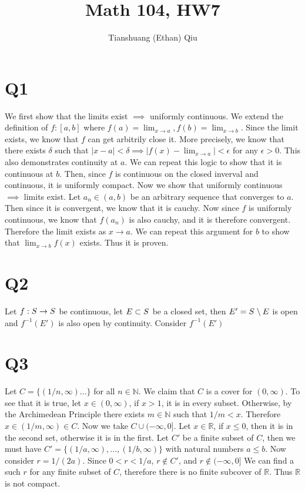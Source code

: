 \documentclass[12pt]{article}
\author{Tianshuang (Ethan) Qiu}
\newcommand{\N}{\mathbb{N}}
\newcommand{\R}{\mathbb{R}}
\begin{document}
\title{Math 104, HW7}
\maketitle
\newpage


\section{Q1}
We first show that the limits exist $\implies$ uniformly continuous. We extend the definition of $f: [a,b]$ where $f(a) = \lim_{x\to a}, f(b) = \lim_{x\to b}$. Since the limit exists, we know that $f$ can get arbitrily close it. More precisely, we know that there exists $\delta$ such that $|x-a| < \delta \implies |f(x)-\lim_{x\to a}|<\epsilon$ for any $\epsilon > 0$. This also demonstrates continuity at $a$. We can repeat this logic to show that it is continuous at $b$. Then, since $f$ is continuous on the closed inverval and continuous, it is uniformly compact.
\newline
Now we show that uniformly continuous $\implies$ limits exist. Let $a_n \in (a,b)$ be an arbitrary sequence that converges to $a$. Then since it is convergent, we know that it is cauchy. Now since $f$ is uniformly continuous, we know that $f(a_n)$ is also cauchy, and it is therefore convergent. Therefore the limit exists as $x \to a$. We can repeat this argument for $b$ to show that $\lim_{x\to b} f(x)$ exists.
\newline
Thus it is proven.
\newpage


\section{Q2}
Let $f: S \to S^{\*}$ be continuous, let $E \subset S^{\*}$ be a closed set, then $E' = S^{\*} \setminus E$ is open and $f^{-1}(E')$ is also open by continuity.
\newline
Consider $f^{-1}(E')$
\newpage


\section{Q3}
Let $C = \{(1/n, \infty)...\}$ for all $n \in \N$.
We claim that $C$ is a cover for $(0, \infty)$. To see that it is true, let $x \in (0, \infty)$, if $x>1$, it is in every subset. Otherwise, by the Archimedean Principle there exists $m \in \N$ such that $1/m < x$. Therefore $x \in (1/m, \infty) \in C$.
\newline
Now we take $C \cup (-\infty, 0]$. Let $x \in \R$, if $ x\leq 0$, then it is in the second set, otherwise it is in the first.
\newline
Let $C'$ be a finite subset of $C$, then we must have $C' = \{(1/a, \infty), ..., (1/b, \infty)\}$ with natural numbers $a \leq b$. Now consider $r = 1/(2a)$. Since $0<r<1/a$, $r \not \in C'$, and $r \not \in (-\infty, 0]$
\newline
We can find a such $r$ for any finite subset of $C$, therefore there is no finite subcover of $\R$. Thus $\R$ is not compact.
\newpage
\end{document}
